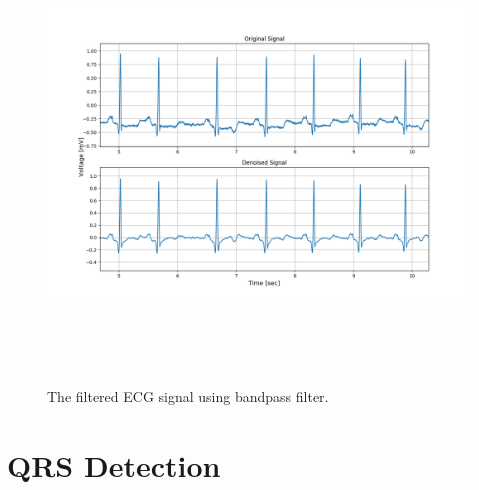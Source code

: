 \begin{figure}[htpb]
	\centering
	\includegraphics[width=15cm,height=12cm,keepaspectratio=true]{images/bandpass_denoised_1}
	\caption{
		The filtered ECG signal using bandpass filter.
	}
	\label{fig:bandpass_denoised}
\end{figure}


\section{QRS Detection}

